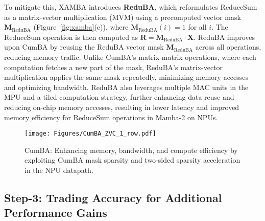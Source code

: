 To mitigate this, XAMBA introduces \textbf{ReduBA}, which reformulates ReduceSum as a matrix-vector multiplication (MVM) using a precomputed vector mask $\mathbf{M}_{\text{ReduBA}}$ (Figure~\ref{fig:xamba}(c)), where $\mathbf{M}_{\text{ReduBA}}(i) = 1$ for all $i$. The ReduceSum operation is then computed as $\mathbf{R} = \mathbf{M}_{\text{ReduBA}} \cdot \mathbf{X}$. 
ReduBA improves upon CumBA by reusing the ReduBA vector mask $\mathbf{M}_{\text{ReduBA}}$ across all operations, reducing memory traffic. Unlike CumBA's matrix-matrix operations, where each computation fetches a new part of the mask, ReduBA’s matrix-vector multiplication applies the same mask repeatedly, minimizing memory accesses and optimizing bandwidth. ReduBA also leverages multiple MAC units in the MPU and a tiled computation strategy, further enhancing data reuse and reducing on-chip memory accesses, resulting in lower latency and improved memory efficiency for ReduceSum operations in Mamba-2 on NPUs.

\begin{figure}[t!]
\begin{center}
\texttt{[image: Figures/CumBA\_ZVC\_1\_row.pdf]}
\end{center}
\caption{CumBA: Enhancing memory, bandwidth, and compute efficiency by exploiting CumBA mask sparsity and two-sided sparsity acceleration in the NPU datapath.}\label{fig:cumba_zvc}
\end{figure}

\subsection{Step-3: Trading Accuracy for Additional Performance Gains}

